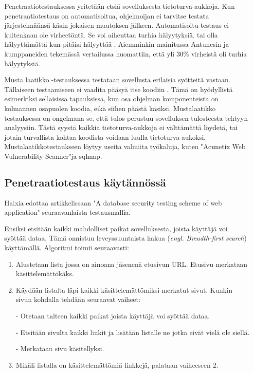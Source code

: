 \documentclass[finnish]{tktltiki2}
\theoremstyle{definition}
\theoremstyle{remark}
\begin{document}
	 Penetraatiotestauksessa yritetään etsiä sovelluksesta tietoturva-aukkoja. Kun penetraatiotestaus on automatisoitua, ohjelmoijan ei tarvitse testata järjestelmäänsä käsin jokaisen muutoksen jälkeen. Automatisoitu testaus ei kuitenkaan ole virheetöntä. Se voi aiheuttaa turhia hälyytyksiä, tai olla hälyyttämättä kun pitäisi hälyyttää \cite{virheita}.  Aiemminkin mainitussa Antunesin ja kumppaneiden tekemässä vertailussa\cite{vertailu} huomattiin, että yli 30\% virheistä oli turhia hälyytyksiä. 
	 
	Musta laatikko -testauksessa testataan sovellusta erilaisia syötteitä vastaan. Tällaiseen testaamiseen ei vaadita pääsyä itse koodiin \cite{testing2}. Tämä on hyödyllistä esimerkiksi sellaisissa tapauksissa, kun osa ohjelman komponenteista on kolmannen osapuolen koodia, eikä siihen päästä käsiksi. Mustalaatikko testauksessa on ongelmana se, että tulos perustuu sovelluksen tulosteesta tehtyyn analyysiin. Tästä syystä kaikkia tietoturva-aukkoja ei välttämättä löydetä, tai jotain turvallista kohtaa koodista voidaan luulla tietoturva-aukoksi. Mustalaatikkotestaukseen löytyy useita valmiita työkaluja, kuten "Acunetix Web Vulnerability Scanner"\space ja sqlmap.
	
	\subsection{Penetraatiotestaus käytännössä}
	 Haixia edottaa artikkelissaan "A database security testing scheme of web application" \cite{testing} seuraavanlaista testausmallia.
	
	Ensiksi etsitään kaikki mahdolliset paikat sovelluksesta, joista käyttäjä voi syöttää dataa. Tämä onnistuu leveyssuuntaista hakua (\textit{engl. Breadth-first search}) käyttämällä. Algoritmi toimii seuraavasti:
	\begin{enumerate}
		\item Alustetaan lista jossa on ainoana jäsenenä etusivun URL. Etusivu merkataan käsittelemättökäks.
		
		\item Käydään listalta läpi kaikki käsittelemättömiksi merkatut sivut. Kunkin sivun kohdalla tehdään seuraavat vaiheet:
		
		- Otetaan talteen kaikki paikat joista käyttäjä voi syöttää dataa.
		
		- Etsitään sivulta kaikki linkit ja lisätään listalle ne jotka eivät vielä ole siellä.
		
		- Merkataan sivu käsitellyksi.
		
		\item Mikäli listalla on käsittelemättömiä linkkejä, palataan vaiheeseen 2.
	\end{enumerate}
	
\end{document}
